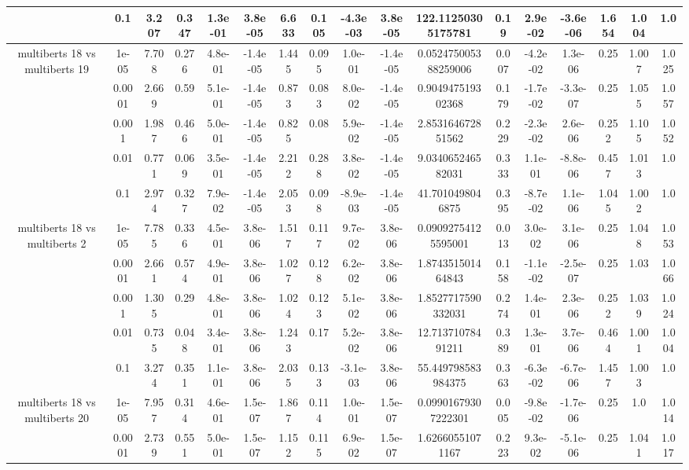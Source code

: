 \begin{tabular}{|c|c|c|c|c|c|c|c|c|c|c|c|c|c|c|c|c|}
 & 0.1 & 3.207 & 0.347 & 1.3e-01 & 3.8e-05 & 6.633 & 0.105 & -4.3e-03 & 3.8e-05 & 122.11250305175781 & 0.19 & 2.9e-02 & -3.6e-06 & 1.654 & 1.004 & 1.0 \\
\hline
\multirow{5}{*}{multiberts 18 vs multiberts 19} & 1e-05 & 7.708 & 0.276 & 4.8e-01 & -1.4e-05 & 1.445 & 0.095 & 1.0e-01 & -1.4e-05 & 0.052475005388259006 & 0.007 & -4.2e-02 & 1.3e-06 & 0.25 & 1.007 & 1.025 \\
 & 0.0001 & 2.669 & 0.59 & 5.1e-01 & -1.4e-05 & 0.873 & 0.083 & 8.0e-02 & -1.4e-05 & 0.904947519302368 & 0.179 & -1.7e-02 & -3.3e-07 & 0.25 & 1.055 & 1.057 \\
 & 0.001 & 1.987 & 0.466 & 5.0e-01 & -1.4e-05 & 0.825 & 0.08 & 5.9e-02 & -1.4e-05 & 2.853164672851562 & 0.229 & -2.3e-02 & 2.6e-06 & 0.252 & 1.105 & 1.052 \\
 & 0.01 & 0.771 & 0.069 & 3.5e-01 & -1.4e-05 & 2.212 & 0.288 & 3.8e-02 & -1.4e-05 & 9.034065246582031 & 0.333 & 1.1e-01 & -8.8e-06 & 0.457 & 1.013 & 1.0 \\
 & 0.1 & 2.974 & 0.327 & 7.9e-02 & -1.4e-05 & 2.053 & 0.098 & -8.9e-03 & -1.4e-05 & 41.7010498046875 & 0.395 & -8.7e-02 & 1.1e-06 & 1.045 & 1.002 & 1.0 \\
\hline
\multirow{5}{*}{multiberts 18 vs multiberts 2} & 1e-05 & 7.785 & 0.336 & 4.5e-01 & 3.8e-06 & 1.517 & 0.117 & 9.7e-02 & 3.8e-06 & 0.09092754125595001 & 0.013 & 3.0e-02 & 3.1e-06 & 0.25 & 1.048 & 1.053 \\
 & 0.0001 & 2.661 & 0.574 & 4.9e-01 & 3.8e-06 & 1.027 & 0.128 & 6.2e-02 & 3.8e-06 & 1.874351501464843 & 0.158 & -1.1e-02 & -2.5e-07 & 0.25 & 1.03 & 1.066 \\
 & 0.001 & 1.305 & 0.29 & 4.8e-01 & 3.8e-06 & 1.024 & 0.123 & 5.1e-02 & 3.8e-06 & 1.8527717590332031 & 0.274 & 1.4e-01 & 2.3e-06 & 0.252 & 1.039 & 1.024 \\
 & 0.01 & 0.735 & 0.048 & 3.4e-01 & 3.8e-06 & 1.243 & 0.17 & 5.2e-02 & 3.8e-06 & 12.71371078491211 & 0.389 & 1.3e-01 & 3.7e-06 & 0.464 & 1.001 & 1.004 \\
 & 0.1 & 3.274 & 0.351 & 1.1e-01 & 3.8e-06 & 2.035 & 0.133 & -3.1e-03 & 3.8e-06 & 55.449798583984375 & 0.363 & -6.3e-02 & -6.7e-06 & 1.457 & 1.003 & 1.0 \\
\hline
\multirow{5}{*}{multiberts 18 vs multiberts 20} & 1e-05 & 7.957 & 0.314 & 4.6e-01 & 1.5e-07 & 1.867 & 0.114 & 1.0e-01 & 1.5e-07 & 0.09901679307222301 & 0.005 & -9.8e-02 & -1.7e-06 & 0.25 & 1.0 & 1.014 \\
 & 0.0001 & 2.739 & 0.551 & 5.0e-01 & 1.5e-07 & 1.152 & 0.115 & 6.9e-02 & 1.5e-07 & 1.62660551071167 & 0.223 & 9.3e-02 & -5.1e-06 & 0.25 & 1.041 & 1.017 \\

\end{tabular}
